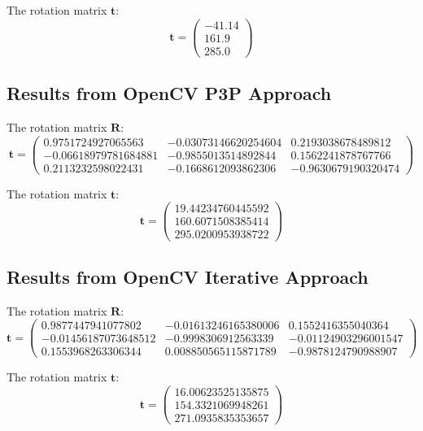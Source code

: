 \documentclass[conference]{IEEEtran}
\newcommand{\mat}[1]{\mathbf{#1}} %
\begin{document}
The rotation matrix $\mat{t}$:
\begin{equation}
	\mat{t} = \left(\begin{array}{c} -41.14\\ 161.9\\ 285.0 \end{array}\right)
\end{equation}

\subsection{Results from OpenCV P3P Approach}
The rotation matrix $\mat{R}$:
\begin{equation}
	\mat{t} = \begin{pmatrix}
	0.9751724927065563 & -0.03073146620254604 & 0.2193038678489812\\
 -0.06618979781684881 & -0.9855013514892844 & 0.1562241878767766\\
 0.2113232598022431 & -0.1668612093862306 & -0.9630679190320474
 	\end{pmatrix}
\end{equation}

The rotation matrix $\mat{t}$:
\begin{equation}
	\mat{t} = \begin{pmatrix}
	19.44234760445592 \\
 160.6071508385414 \\
 295.0200953938722
 	\end{pmatrix}
\end{equation}

\subsection{Results from OpenCV Iterative Approach}
The rotation matrix $\mat{R}$:
\begin{equation}
	\mat{t} = \begin{pmatrix}
	0.9877447941077802 & -0.01613246165380006 & 0.1552416355040364\\
 -0.01456187073648512 & -0.9998306912563339 & -0.01124903296001547\\
 0.1553968263306344 & 0.008850565115871789 & -0.9878124790988907
 	\end{pmatrix}
\end{equation}

The rotation matrix $\mat{t}$:
\begin{equation}
	\mat{t} = \begin{pmatrix}
	16.00623525135875\\
 154.3321069948261\\
 271.0935835353657
 	\end{pmatrix}
\end{equation}
\end{document}
